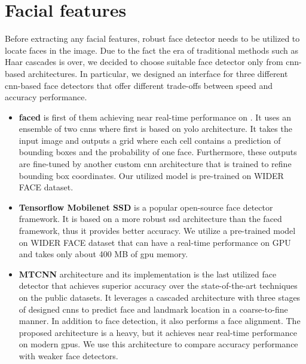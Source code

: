     \section{Facial features}
        Before extracting any facial features, robust face detector needs to be utilized to locate faces in the image. Due to the fact the era of traditional methods such as Haar cascades \cite{viola2001rapid} is over, we decided to choose suitable face detector only from \gls{cnn}-based architectures. In particular, we designed an interface for three different \gls{cnn}-based face detectors that offer different trade-offs between speed and accuracy performance. 

        \begin{itemize}
            \item \textbf{faced} \cite{faced} is first of them achieving near real-time performance on . It uses an ensemble of two \gls{cnn}s where first is based on \gls{yolo} architecture. It takes the input image and outputs a grid where each cell contains a prediction of bounding boxes and the probability of one face. Furthermore, these outputs are fine-tuned by another custom \gls{cnn} architecture that is trained to refine bounding box coordinates. Our utilized model is pre-trained on WIDER FACE \cite{yang2016wider} dataset. 
            \item \textbf{Tensorflow Mobilenet SSD} \cite{itzcovichtfdetector} is a popular open-source face detector framework. It is based on a more robust \gls{ssd} \cite{liu2016ssd} architecture than the faced framework, thus it provides better accuracy. We utilize a pre-trained model on WIDER FACE \cite{yang2016wider} dataset that can have a real-time performance on GPU and takes only about 400 MB of \gls{gpu} memory.
            \item \textbf{MTCNN} architecture \cite{7553523} and its implementation \cite{centenomtcnn} is the last utilized face detector that achieves superior accuracy over the state-of-the-art techniques on the public datasets. It leverages a cascaded architecture with three stages of designed \gls{cnn}s to predict face and landmark location in a coarse-to-fine manner. In addition to face detection, it also performs a face alignment. The proposed architecture is a heavy, but it achieves near real-time performance on modern \gls{gpu}s. We use this architecture to compare accuracy performance with weaker face detectors.
        \end{itemize}
        
